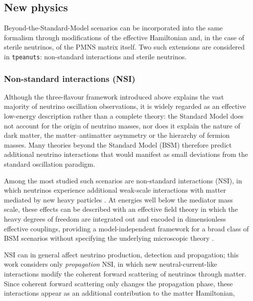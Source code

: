 \subsection{New physics}

Beyond-the-Standard-Model scenarios can be incorporated into the same formalism through modifications of the effective Hamiltonian and, in the case of sterile neutrinos, of the PMNS matrix itself. Two such extensions are considered in \texttt{tpeanuts}: non-standard interactions and sterile neutrinos.

\subsubsection{Non-standard interactions (NSI)}
\label{sec:nsi-formalism}

Although the three-flavour framework introduced above explains the vast majority of neutrino oscillation observations, it is widely regarded as an effective low-energy description rather than a complete theory: the Standard Model does not account for the origin of neutrino masses, nor does it explain the nature of dark matter, the matter--antimatter asymmetry or the hierarchy of fermion masses. Many theories beyond the Standard Model (BSM) therefore predict additional neutrino interactions that would manifest as small deviations from the standard oscillation paradigm.

Among the most studied such scenarios are non-standard interactions (NSI), in which neutrinos experience additional weak-scale interactions with matter mediated by new heavy particles \parencite{Grossman1995}. At energies well below the mediator mass scale, these effects can be described with an effective field theory in which the heavy degrees of freedom are integrated out and encoded in dimensionless effective couplings, providing a model-independent framework for a broad class of BSM scenarios without specifying the underlying microscopic theory \parencite{FarzanTortola2018}.

NSI can in general affect neutrino production, detection and propagation; this work considers only \emph{propagation} NSI, in which new neutral-current-like interactions modify the coherent forward scattering of neutrinos through matter. Since coherent forward scattering only changes the propagation phase, these interactions appear as an additional contribution to the matter Hamiltonian,

